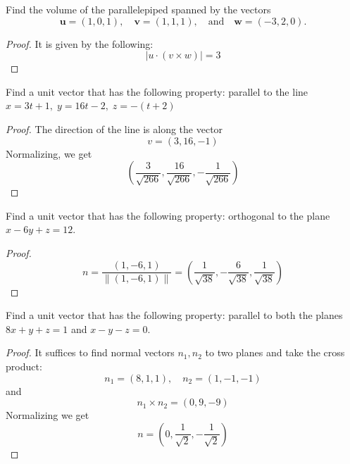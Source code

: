\documentclass[openany]{book}
\begin{document}
\begin{prob}[36]
    Find the volume of the parallelepiped spanned by the vectors  
\[
\mathbf{u} = (1, 0, 1), \quad \mathbf{v} = (1, 1, 1), \quad \text{and} \quad \mathbf{w} = (-3, 2, 0).
\]
\end{prob}
\begin{proof}
    It is given by the following:
    \begin{equation*}
        |u\cdot(v\times w)|=3
    \end{equation*}
\end{proof}


\begin{prob}[52]
    Find a unit vector that has the following property:
    parallel to the line \( x = 3t + 1, \; y = 16t - 2, \; z = -(t + 2) \)
\end{prob}
\begin{proof}
    The direction of the line is along the vector 
    \begin{equation*}
        v=(3, 16, -1)
    \end{equation*}
    Normalizing, we get 
    \begin{equation*}
        \left(\frac{3}{\sqrt{266}}, \frac{16}{\sqrt{266}}, -\frac{1}{\sqrt{266}}\right)
    \end{equation*}
\end{proof}



\begin{prob}[53]
    Find a unit vector that has the following property: 
    orthogonal to the plane \( x - 6y + z = 12 \).
\end{prob}
\begin{proof}
    \begin{equation*}
        n=\frac{(1, -6, 1)}{\|(1, -6, 1)\|}=\left(\frac{1}{\sqrt{38}}, -\frac{6}{\sqrt{38}}, \frac{1}{\sqrt{38}}\right)
    \end{equation*}
\end{proof}


\begin{prob}[54]
    Find a unit vector that has the following property:
    parallel to both the planes \( 8x + y + z = 1 \) and \( x - y - z = 0 \).
\end{prob}
\begin{proof}
    It suffices to find normal vectors $n_1, n_2$ to two planes and take the cross product:
    \begin{equation*}
        n_1=(8,1,1), \quad n_2=(1,-1, -1)
    \end{equation*}
    and 
    \begin{equation*}
        n_1\times n_2=(0, 9, -9)
    \end{equation*}
    Normalizing we get 
    \begin{equation*}
        n=\left(0, \frac{1}{\sqrt{2}}, -\frac{1}{\sqrt{2}}\right)
    \end{equation*}
\end{proof}
\end{document}
